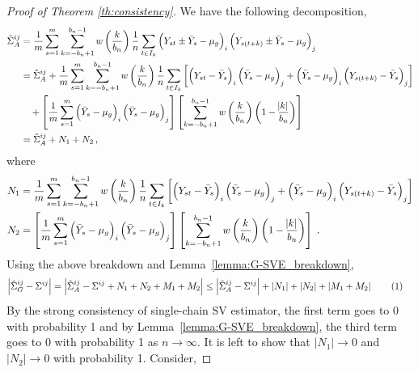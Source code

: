 \documentclass[11pt]{article}
\newcommand\numberthis{\addtocounter{equation}{1}\tag{\theequation}}
\theoremstyle{remark}
\begin{document}
\begin{proof}[Proof of Theorem \ref{th:consistency}]
We have the following decomposition,
\begin{align*}
\tilde{\Sigma}_{A}^{ij}
    & = \dfrac{1}{m}\sum_{s=1}^{m}\sum_{k=-b_n+1}^{b_n-1}w\left(\dfrac{k}{b_n}\right)\dfrac{1}{n}\sum_{t \in I_k}  \left(Y_{st} \pm \bar{Y}_s - \mu_g \right)_i  \left(Y_{s(t + k)} \pm \bar{Y}_s - \mu_g \right)_j\\
    & = \hat{\Sigma}_{A}^{ij} + \dfrac{1}{m}\sum_{s=1}^{m}\sum_{k=-b_n+1}^{b_n-1}w\left(\dfrac{k}{b_n}\right)\dfrac{1}{n}\sum_{t \in I_k}\left[ \left(Y_{st} - \bar{Y}_s \right)_i   \left(\bar{Y}_s - \mu_g \right)_j + \left(\bar{Y}_s - \mu_g \right)_i  \left(Y_{s(t+k)} - \bar{Y}_s \right)_j\right]\\
    & \quad + \left[\dfrac{1}{m}  \sum_{s=1}^{m}  \left(\bar{Y}_s - \mu_g \right)_i  \left(\bar{Y}_s - \mu_g \right)_j \right]  \left[\sum_{k=-b_n+1}^{b_n-1}w\left(\dfrac{k}{b_n}\right)\left(1 - \dfrac{\abs{k}}{b_n}\right) \right]\\
    & = \hat{\Sigma}_{A}^{ij} + N_1 + N_2 \,,
\end{align*}
where
\begin{align*}
N_1 & = \dfrac{1}{m}\sum_{s=1}^{m}  \sum_{k=-b_n+1}^{b_n-1}  w\left(\dfrac{k}{b_n}\right)\dfrac{1}{n}  \sum_{t \in I_k}  \left[ \left(Y_{st} - \bar{Y}_s \right)_i  \left(\bar{Y}_s - \mu_g \right)_j + \left(\bar{Y}_s - \mu_g \right)_i  \left(Y_{s(t+k)} - \bar{Y}_s \right)_j\right]\\
N_2 & = \left[\dfrac{1}{m}  \sum_{s=1}^{m}  \left(\bar{Y}_s - \mu_g \right)_i  \left(\bar{Y}_s - \mu_g \right)_j \right]  \left[\sum_{k=-b_n+1}^{b_n-1}w\left(\dfrac{k}{b_n}\right)\left(1 - \dfrac{\abs{k}}{b_n}\right) \right]\;.
\end{align*}
%
Using the above breakdown and  Lemma~\ref{lemma:G-SVE_breakdown}, 
\begin{align*}
\left|\hat{\Sigma}_{G}^{ij} - \Sigma^{ij} \right| & = \left| \hat{\Sigma}_{A}^{ij} - \Sigma^{ij} + N_1 + N_2 + M_1 + M_2 \right|  \leq \left| \hat{\Sigma}_{A}^{ij} - \Sigma^{ij} \right| +  \left| N_1 \right| +  \left|N_2 \right| + \left| M_1 + M_2 \right| \numberthis \label{eq:G-SVE_full_decomp}
\end{align*}
%
By the strong consistency of single-chain SV estimator, the first term goes to 0 with probability 1 and by Lemma~\ref{lemma:G-SVE_breakdown}, the third term goes to 0 with probability 1 as $n \to \infty$. It is left to show that $|N_1| \to 0$ and $|N_2| \to 0$ with probability 1. Consider,

\end{proof}
\end{document}
